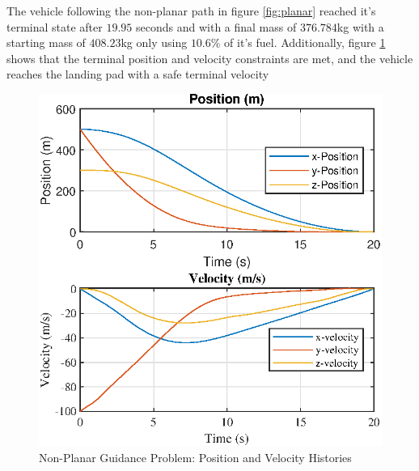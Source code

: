 The vehicle following the non-planar path in figure \ref{fig:planar} reached it's terminal state after $19.95$ seconds and with a final mass of $376.784$kg with a starting mass of $408.23$kg only using $10.6$\% of it's fuel. Additionally, figure \ref{fig:nplanar_rv} shows that the terminal position and velocity constraints are met, and the vehicle reaches the landing pad with a safe terminal velocity
\begin{figure}[ht] 
  \centering
  \includegraphics[width=.7\linewidth]{figs/nonplanar_rv.eps}
  \caption{Non-Planar Guidance Problem: Position and Velocity Histories}
  \label{fig:nplanar_rv}
\end{figure}
